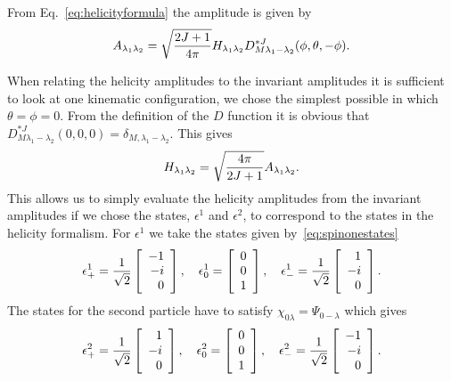 From Eq.~\ref{eq:helicityformula} the amplitude is given by
\begin{equation}
A_{\lambda_1\lambda_2}=\sqrt{2J+1\over 4\pi}H_{\lambda_1\lambda_2}
D^{*J}_{M\lambda_1-\lambda_2}(\phi,\theta,-\phi).
\end{equation}

When relating the helicity amplitudes to the invariant amplitudes
it is sufficient to look at one kinematic configuration, we chose
the simplest possible in which $\theta=\phi=0$. From the
definition of the $D$ function it is obvious that 
$D^{*J}_{M\lambda_1-\lambda_2}(0,0,0)=\delta_{M,\lambda_1-\lambda_2}$.
This gives
\begin{equation}
H_{\lambda_1\lambda_2}=\sqrt{4\pi\over 2J+1}A_{\lambda_1\lambda_2}.
\end{equation}
This allows us to simply evaluate the helicity amplitudes from the
invariant amplitudes if we chose the states, $\epsilon^1$ and $\epsilon^2$,
to correspond to the states in the helicity formalism. 
For $\epsilon^1$ we take the states given by~\ref{eq:spinonestates}
\begin{equation}
\epsilon^1_+={1\over\sqrt{2}}\left[\begin{array}{r}
          -1  \\
          -i  \\
          0  \\
          \end{array}\right],\quad
\epsilon^1_0=\left[\begin{array}{r}
          0  \\
          0  \\
          1  \\
          \end{array}\right],\quad
\epsilon^1_-={1\over\sqrt{2}}\left[\begin{array}{r}
          1  \\
          -i  \\
          0  \\
          \end{array}\right].
\end{equation}
The states for the second particle have to satisfy 
$\chi_{0\lambda}=\Psi_{0-\lambda}$ which gives
\begin{equation}
\epsilon^2_+={1\over\sqrt{2}}\left[\begin{array}{r}
          1  \\
          -i  \\
          0  \\
          \end{array}\right],\quad
\epsilon^2_0=\left[\begin{array}{r}
          0  \\
          0  \\
          1  \\
          \end{array}\right],\quad
\epsilon^2_-={1\over\sqrt{2}}\left[\begin{array}{r}
          -1  \\
          -i  \\
          0  \\
          \end{array}\right].
\end{equation}
